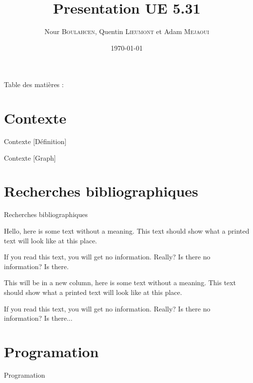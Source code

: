 \documentclass{beamer}
\title{Presentation UE 5.31}
\author{
    Nour \textsc{Boulahcen},
    Quentin \textsc{Lieumont} et
    Adam \textsc{Mejaoui}
}
\institute{Institut Villebon Georges \textsc{Charpak}}
\date{\today}
\begin{document}
\begin{frame}
    \titlepage
\end{frame}

\begin{frame}{Table des matières :}
    \tableofcontents
\end{frame}


\section{Contexte}\label{sec:contexte}
\begin{frame}{Contexte}
    {
        [Définition]
    }
\end{frame}

\begin{frame}{Contexte}
    {
        [Graph]
    }
\end{frame}


\section{Recherches bibliographiques}\label{sec:recherches-bibliographiques}
\begin{frame}{Recherches bibliographiques}
    \begin{multicols}{2}
Hello, here is some text without a meaning.  This text should show what
a printed text will look like at this place.

If you read this text, you will get no information.  Really?  Is there
no information?  Is there.

\columnbreak

This will be in a new column, here is some text without a meaning.  This text
should show what a printed text will look like at this place.

If you read this text, you will get no information.  Really?  Is there
no information?  Is there...
    \end{multicols}
\end{frame}



\section{Programation}\label{sec:programation}
\begin{frame}{Programation}

\end{frame}
\end{document}
